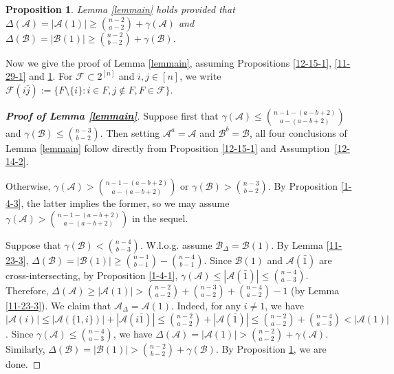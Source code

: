 \documentclass[11pt]{article}
\newcommand{\m}{\mathcal}
\newtheorem{proposition}[theorem]{Proposition}
\begin{document}
\begin{proposition}\label{10-25-3}
Lemma \ref{lemmain} holds provided that $\Delta(\mathcal{A})=|\mathcal{A}(1)|\ge {n-2\choose a-2}+\gamma(\mathcal{A})$ and 
$\Delta(\mathcal{B})=|\mathcal{B}(1)|\ge {n-2\choose b-2}+\gamma(\mathcal{B})$.
\end{proposition}

Now we give the proof of Lemma \ref{lemmain}, assuming Propositions \ref{12-15-1}, \ref{11-29-1} and \ref{10-25-3}. 
For $\m F\subset 2^{[n]}$ and $i,j\in [n]$, we write
$\m F(i\bar j):=\{F\setminus \{i\}: i\in F, j\not\in F, F\in \m F\}$.

\begin{proof}[{\bf Proof of Lemma \ref{lemmain}}]
Suppose first that $\gamma(\mathcal{A})\le {n-1-(a-b+2)\choose a-(a-b+2)}$ and $\gamma(\mathcal{B})\le {n-3\choose b-2}$.
Then setting $\m A^a=\m A$ and $\m B^b=\m B$, all four conclusions of Lemma \ref{lemmain} follow directly from 
 Proposition \ref{12-15-1} and Assumption~\ref{12-14-2}. 
 
Otherwise, $\gamma(\mathcal{A})> {n-1-(a-b+2)\choose a-(a-b+2)}$ or $\gamma(\mathcal{B})> {n-3\choose b-2}$.  
By Proposition \ref{1-4-3}, the latter implies the former, so we may assume $\gamma(\mathcal{A})> {n-1-(a-b+2)\choose a-(a-b+2)}$ in the sequel. 


Suppose that $\gamma(\mathcal{B})<{n-4\choose b-3}$. W.l.o.g. assume $\m B_{\Delta}=\m B(1)$.
By Lemma \ref{11-23-3}, $\Delta(\mathcal{B})=|\mathcal{B}(1)|\ge {n-1\choose b-1}-{n-4\choose b-1}$. 
 Since $\mathcal{B}(1)$ and $\mathcal{A}(\bar{1})$ are cross-intersecting, by Proposition \ref{1-4-1},
 $\gamma(\mathcal{A})\le |\mathcal{A}(\bar{1})|\le {n-4\choose a-3}$. Therefore, 
 $\Delta(\mathcal{A})\ge |\mathcal{A}(1)|>{n-2\choose a-2}+{n-3\choose a-2}+{n-4\choose a-2}-1$ (by Lemma \ref{11-23-3}). 
 We claim that $\m A_{\Delta}=\m A(1)$. 
 Indeed, for any $i\ne 1$, we have $|\m A(i)|\le |\m A(\{1,i\})|+|\m A(i\bar{1})|\le {n-2\choose a-2}+|\m A(\bar{1})|\le {n-2\choose a-2}+{n-4\choose a-3}<|\mathcal{A}(1)|$.
Since $\gamma(\mathcal{A})\le {n-4\choose a-3}$, we have $\Delta(\mathcal{A})= |\mathcal{A}(1)|>{n-2\choose a-2}+\gamma(\mathcal{A})$. Similarly, $\Delta(\mathcal{B})= |\mathcal{B}(1)|>{n-2\choose b-2}+\gamma(\mathcal{B})$. 
 By Proposition \ref{10-25-3}, we are done. 


\end{proof}
\end{document}
